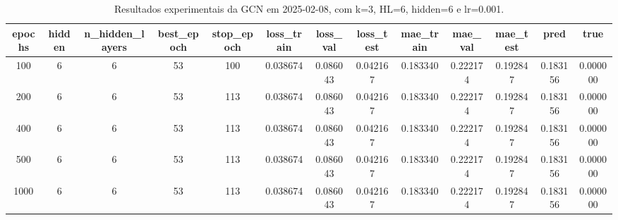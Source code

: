 \begin{table}[h]
\centering
\caption{Resultados experimentais da GCN em 2025-02-08, com k=3, HL=6, hidden=6 e lr=0.001.}
\label{tab:gcn_results_k3_hl6_h6_d20250208}
\begin{tabular}{ccccccccccccc}
\toprule
epochs & hidden & n\_hidden\_layers & best\_epoch & stop\_epoch & loss\_train & loss\_val & loss\_test & mae\_train & mae\_val & mae\_test & pred & true \\
\midrule
100 & 6 & 6 & 53 & 100 & 0.038674 & 0.086043 & 0.042167 & 0.183340 & 0.222174 & 0.192847 & 0.183156 & 0.000000 \\
200 & 6 & 6 & 53 & 113 & 0.038674 & 0.086043 & 0.042167 & 0.183340 & 0.222174 & 0.192847 & 0.183156 & 0.000000 \\
400 & 6 & 6 & 53 & 113 & 0.038674 & 0.086043 & 0.042167 & 0.183340 & 0.222174 & 0.192847 & 0.183156 & 0.000000 \\
500 & 6 & 6 & 53 & 113 & 0.038674 & 0.086043 & 0.042167 & 0.183340 & 0.222174 & 0.192847 & 0.183156 & 0.000000 \\
1000 & 6 & 6 & 53 & 113 & 0.038674 & 0.086043 & 0.042167 & 0.183340 & 0.222174 & 0.192847 & 0.183156 & 0.000000 \\
\bottomrule
\end{tabular}
\end{table}
